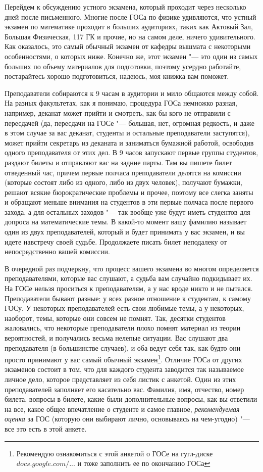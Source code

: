 Перейдем к обсуждению устного экзамена, который проходит через несколько дней после письменного. Многие после ГОСа по физике удивляются, что устный экзамен по математике проходит в больших аудиториях, таких как Актовый Зал, Большая Физическая, 117 ГК и прочие, но на самом деле, ничего удивительного. Как оказалось, это самый обычный экзамен от кафедры вышмата с некоторыми особенностями, о которых ниже. Конечно же, этот экзамен "--- это один из самых больших по объему материалов для подготовки, поэтому усердно работайте, постарайтесь хорошо подготовиться, надеюсь, моя книжка вам поможет.

Преподаватели собираются к 9 часам в аудитории и мило общаются между собой. На разных факультетах, как я понимаю, процедура ГОСа немножко разная, например, деканат может прийти и смотреть, как бы кого не отправили с пересдачей (да, пересдачи на ГОСе "--- большая, нет, огромная редкость, и даже в этом случае за вас деканат, студенты и остальные преподаватели заступятся), может прийти секретарь из деканата и заниматься бумажной работой, освободив одного преподавателя от этих дел. В 9 часов запускают первые группы студентов, раздают билеты и отправляют вас на задние парты. Там вы пишете билет отведенный час, причем первые полчаса  преподаватели делятся на комиссии (которые состоят либо из одного, либо из двух человек), получают бумажки, решают всякие бюрократические проблемы и прочее, поэтому все слегка заняты и обращают меньше внимания на студентов в эти первые полчаса после первого захода, а для остальных заходов "--- так вообще уже будут иметь студентов для допроса на математические темы. В какой-то момент вашу фамилию называет один из двух преподавателей, который и будет принимать у вас экзамен, и вы идете навстречу своей судьбе. Продолжаете писать билет неподалеку от непосредственно вашей комиссии.

В очередной раз подчеркну, что процесс вашего экзамена во многом определяется преподавателями, которые вас слушают, а судьба вам случайно подкидывает их. На ГОСе нельзя проситься к преподавателям, а у нас вроде никто и не пытался. Преподаватели бывают разные: у всех разное отношение к студентам, к самому ГОСу. У некоторых преподавателей есть свои любимые темы, а у некоторых, наоборот, темы, которые они совсем не помнят. Так, десятки студентов жаловались, что некоторые преподаватели плохо помнят материал из теории вероятностей, и получались весьма нелепые ситуации. Вас слушают два преподавателя (в большинстве случаев), и оба ведут себя так, как будто они просто принимают у вас самый обычный экзамен\footnote{Рекомендую ознакомиться с  этой анкетой о ГОСе на гугл-диске \href{https://docs.google.com/spreadsheets/d/1l2de9_qlCLvvqJIK8ZY6rtk_TJQbvo8cWd5o7uVtl2M/edit\#gid=0}{$docs.google.com/...$} и тоже заполнить ее по окончанию ГОСа}. Отличие ГОСа от других экзаменов состоит в том, что для каждого студента заводится так называемое личное дело, которое представляет из себя листик с анкетой. Один из этих преподавателей заполняет его касательно вас. Фамилия, имя, отчество, номер билета, вопросы в билете, какие были дополнительные вопросы, как вы ответили на все, какое общее впечатление о студенте и самое главное, \textit{рекомендуемая оценка} за ГОС (которую они выбирают лично, основываясь на чем-угодно) "--- все это есть в этой анкете. 

